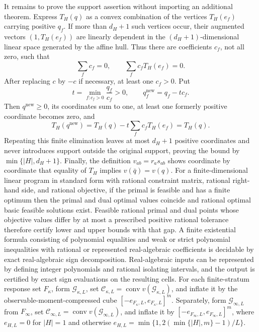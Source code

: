 It remains to prove the support assertion without importing an additional theorem.  Express \(T_H(q)\) as a convex combination of the vertices \(T_H(e_f)\) carrying positive \(q_f\).  If more than \(d_H+1\) such vertices occur, their augmented vectors \((1,T_H(e_f))\) are linearly dependent in the \((d_H+1)\)-dimensional linear space generated by the affine hull.  Thus there are coefficients \(c_f\), not all zero, such that
\[
 \sum_f c_f=0,
 \qquad
 \sum_f c_fT_H(e_f)=0.
\]
After replacing \(c\) by \(-c\) if necessary, at least one \(c_f>0\).  Put
\[
 t=\min_{f:c_f>0}\frac{q_f}{c_f}>0,
 \qquad
 q_f^{\mathrm{new}}=q_f-tc_f.
\]
Then \(q^{\mathrm{new}}\ge0\), its coordinates sum to one, at least one formerly positive coordinate becomes zero, and
\[
 T_H(q^{\mathrm{new}})=T_H(q)-t\sum_fc_fT_H(e_f)=T_H(q).
\]
Repeating this finite elimination leaves at most \(d_H+1\) positive coordinates and never introduces support outside the original support, proving the bound by \(\min\{|H|,d_H+1\}\).  Finally, the definition \(v_{ab}=r_as_{ab}\) shows coordinate by coordinate that equality of \(T_H\) implies \(v(\bar q)=v(q)\).
For a finite-dimensional linear program in standard form with rational constraint matrix, rational right-hand side, and rational objective, if the primal is feasible and has a finite optimum then the primal and dual optimal values coincide and rational optimal basic feasible solutions exist.  Feasible rational primal and dual points whose objective values differ by at most a prescribed positive rational tolerance therefore certify lower and upper bounds with that gap.
A finite existential formula consisting of polynomial equalities and weak or strict polynomial inequalities with rational or represented real-algebraic coefficients is decidable by exact real-algebraic sign decomposition.  Real-algebraic inputs can be represented by defining integer polynomials and rational isolating intervals, and the output is certified by exact sign evaluations on the resulting cells.
For each finite-stratum response set \(F_\kappa\), form \(\mathcal G_{\kappa,L}\), set \(\mathcal C_{\kappa,L}=\operatorname{conv}v(\mathcal G_{\kappa,L})\), and inflate it by the observable-moment-compressed cube \([-e_{F_\kappa,L},e_{F_\kappa,L}]^m\).  Separately, form \(\mathcal G_{\infty,L}\) from \(F_\infty\), set \(\mathcal C_{\infty,L}=\operatorname{conv}v(\mathcal G_{\infty,L})\), and inflate it by \([-e_{F_\infty,L},e_{F_\infty,L}]^m\), where \(e_{H,L}=0\) for \(|H|=1\) and otherwise \(e_{H,L}=\min\{1,2(\min\{|H|,m\}-1)/L\}\).
